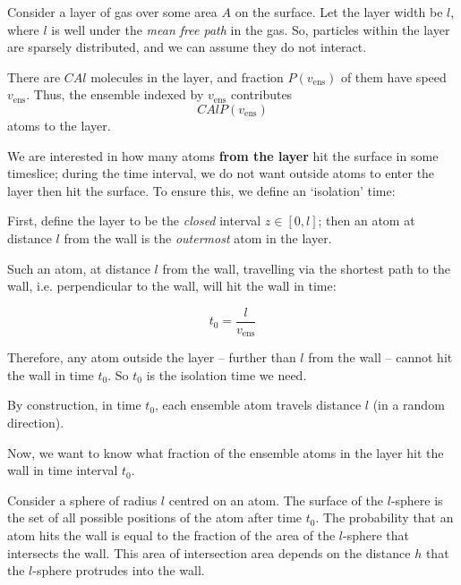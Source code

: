 \documentclass[a4paper]{report}
\newcommand{\vens}{\ensuremath{v_{\mathrm{ens}}}}
\begin{document}
\vspace{1em}
Consider a layer of gas over some area $A$ on the surface. Let the layer width be $l$, where $l$ is well under the \emph{mean free path} in the gas. So, particles within the layer are sparsely distributed, and we can assume they do not interact.

There are $CAl$ molecules in the layer, and fraction $P(\vens)$ of them have speed $\vens$.
Thus, the ensemble indexed by $\vens$ contributes
\begin{equation}
C A l P(\vens)
\end{equation}
atoms to the layer.

\vspace{1em}
We are interested in how many atoms \textbf{from the layer} hit the surface in some timeslice; during the time interval, we do not want outside atoms to enter the layer then hit the surface. To ensure this, we define an `isolation' time:

First, define the layer to be the \emph{closed} interval $z \in [0,l]$; then an atom at distance $l$ from the wall is the \emph{outermost} atom in the layer.

Such an atom, at distance $l$ from the wall, travelling via the shortest path to the wall, i.e. perpendicular to the wall, will hit the wall in time:

\begin{equation}
t_0 = \frac{l}{\vens}
\end{equation}

Therefore, any atom outside the layer -- further than $l$ from the wall -- cannot hit the wall in time $t_0$.  So $t_0$ is the isolation time we need.

By construction, in time $t_0$, each ensemble atom travels distance $l$ (in a random direction).

\vspace*{1em}
Now, we want to know what fraction of the ensemble atoms in the layer hit the wall in time interval $t_0$.  

Consider a sphere of radius $l$ centred on an atom. The surface of the $l$-sphere is the set of all possible positions of the atom after time $t_0$.
The probability that an atom hits the wall is equal to the fraction of the area of the  $l$-sphere that intersects the wall. This area of intersection area depends on the distance $h$ that the $l$-sphere protrudes into the wall.

%
%
%
\end{document}

